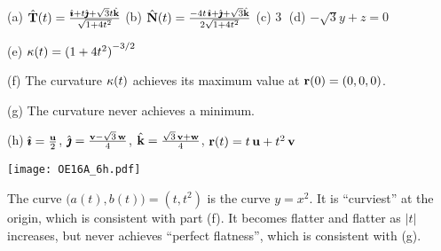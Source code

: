\begin{answer} 
(a) $\hat{\mathbf{T}}(t)=\frac{\hat{\pmb{\imath}} + t\hat{\pmb{\jmath}} + \sqrt{3} t\hat{\mathbf{k}} }{\sqrt{1+4t^2}}$\quad
(b) $\hat{\mathbf{N}}(t)=\frac{-4t\,\hat{\pmb{\imath}} + \hat{\pmb{\jmath}} + \sqrt{3} \hat{\mathbf{k}} }{2\sqrt{1+4t^2}}$\quad
(c) \textcircled{3}  \quad
(d) $-\sqrt{3} y + z=0$ \quad

(e) $\kappa(t)={(1+4t^2)}^{-3/2}$\quad

(f) The curvature $\kappa(t)$ achieves its maximum value at $\mathbf{r}(0)=(0,0,0)$.\quad

(g) The curvature never achieves a minimum.

(h) $\hat{\pmb{\imath}}=\frac{\mathbf{u}}{2}$, 
    $\hat{\pmb{\jmath}}=\frac{\mathbf{v}-\sqrt{3}\,\mathbf{w}}{4}$,
    $\hat{\mathbf{k}}=\frac{\sqrt{3}\,\mathbf{v}+\mathbf{w}}{4}$,
    $\mathbf{r}(t) = t\,\mathbf{u} + t^2 \,\mathbf{v}$

\begin{center}
       \texttt{[image: OE16A\_6h.pdf]}
\end{center}

The curve $\big(a(t),b(t)\big)=(t,t^2)$ is the curve $y=x^2$.
It is ``curviest'' at the origin, which is consistent with part (f).
It becomes flatter and flatter as $|t|$ increases, but never achieves
``perfect flatness'', which is consistent with (g).


\end{answer}

